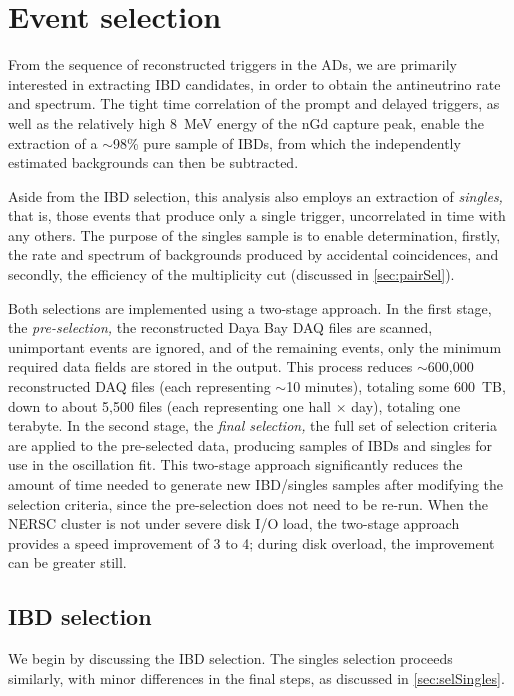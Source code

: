 \documentclass[../thesis.tex]{subfiles}
\begin{document}
\chapter{Event selection}
\label{chap:selection}

From the sequence of reconstructed triggers in the ADs, we are primarily interested in extracting IBD candidates, in order to obtain the antineutrino rate and spectrum. The tight time correlation of the prompt and delayed triggers, as well as the relatively high 8~MeV energy of the nGd capture peak, enable the extraction of a $\sim$98\% pure sample of IBDs, from which the independently estimated backgrounds can then be subtracted.

Aside from the IBD selection, this analysis also employs an extraction of \emph{singles,} that is, those events that produce only a single trigger, uncorrelated in time with any others. The purpose of the singles sample is to enable determination, firstly, the rate and spectrum of backgrounds produced by accidental coincidences, and secondly, the efficiency of the multiplicity cut (discussed in \autoref{sec:pairSel}).

Both selections are implemented using a two-stage approach. In the first stage, the \emph{pre-selection,} the reconstructed Daya Bay DAQ files are scanned, unimportant events are ignored, and of the remaining events, only the minimum required data fields are stored in the output. This process reduces $\sim$600,000 reconstructed DAQ files (each representing $\sim$10 minutes), totaling some 600~TB, down to about 5,500 files (each representing one hall $\times$ day), totaling one terabyte. In the second stage, the \emph{final selection,} the full set of selection criteria are applied to the pre-selected data, producing samples of IBDs and singles for use in the oscillation fit. This two-stage approach significantly reduces the amount of time needed to generate new IBD/singles samples after modifying the selection criteria, since the pre-selection does not need to be re-run. When the NERSC cluster is not under severe disk I/O load, the two-stage approach provides a speed improvement of 3 to 4; during disk overload, the improvement can be greater still.

\section{IBD selection}
\label{sec:selIBDs}

We begin by discussing the IBD selection. The singles selection proceeds similarly, with minor differences in the final steps, as discussed in \autoref{sec:selSingles}.
\end{document}
